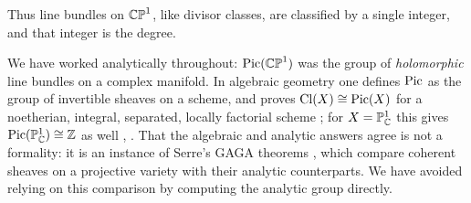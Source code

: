 Thus line bundles on $\mathbb{CP}^1$, like divisor classes, are classified by a single
integer, and that integer is the degree.

\begin{remark}\label{rem:algebraic}
We have worked analytically throughout: $\operatorname{Pic}(\mathbb{CP}^1)$ was the group of
\emph{holomorphic} line bundles on a complex manifold. In algebraic geometry one
defines $\operatorname{Pic}$ as the group of invertible sheaves on a scheme, and proves
$\operatorname{Cl}(X) \cong \operatorname{Pic}(X)$ for a noetherian, integral, separated, locally factorial
scheme \cite[Cor.~II.6.16]{Hartshorne}; for $X = \mathbb{P}^1_{\mathbb{C}}$ this gives
$\operatorname{Pic}(\mathbb{P}^1_{\mathbb{C}}) \cong \mathbb{Z}$ as well \cite[Prop.~II.6.4]{Hartshorne},
\cite[Tag 0BXJ]{Stacks}. That the algebraic and analytic answers agree is not a
formality: it is an instance of Serre's GAGA theorems \cite{GAGA}, which compare
coherent sheaves on a projective variety with their analytic counterparts. We
have avoided relying on this comparison by computing the analytic group directly.
\end{remark}

